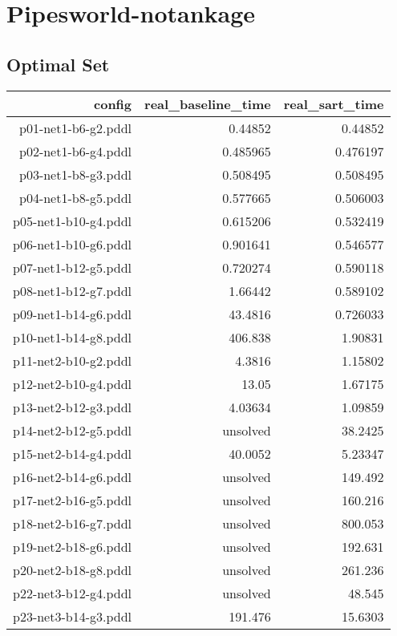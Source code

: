 \documentclass{article}
\begin{document}
                \newpage \section{Pipesworld-notankage}
                    \subsection*{Optimal Set}
                    
                            \begin{center}
                            \scriptsize
                            \begin{tabular}{r|r|r}
                            config & real\_baseline\_time & real\_sart\_time\\\midrule
                             p01-net1-b6-g2.pddl&0.44852&0.44852\\
 p02-net1-b6-g4.pddl&0.485965&0.476197\\
 p03-net1-b8-g3.pddl&0.508495&0.508495\\
 p04-net1-b8-g5.pddl&0.577665&0.506003\\
 p05-net1-b10-g4.pddl&0.615206&0.532419\\
 p06-net1-b10-g6.pddl&0.901641&0.546577\\
 p07-net1-b12-g5.pddl&0.720274&0.590118\\
 p08-net1-b12-g7.pddl&1.66442&0.589102\\
 p09-net1-b14-g6.pddl&43.4816&0.726033\\
 p10-net1-b14-g8.pddl&406.838&1.90831\\
 p11-net2-b10-g2.pddl&4.3816&1.15802\\
 p12-net2-b10-g4.pddl&13.05&1.67175\\
 p13-net2-b12-g3.pddl&4.03634&1.09859\\
 p14-net2-b12-g5.pddl&unsolved&38.2425\\
 p15-net2-b14-g4.pddl&40.0052&5.23347\\
 p16-net2-b14-g6.pddl&unsolved&149.492\\
 p17-net2-b16-g5.pddl&unsolved&160.216\\
 p18-net2-b16-g7.pddl&unsolved&800.053\\
 p19-net2-b18-g6.pddl&unsolved&192.631\\
 p20-net2-b18-g8.pddl&unsolved&261.236\\
 p22-net3-b12-g4.pddl&unsolved&48.545\\
 p23-net3-b14-g3.pddl&191.476&15.6303\\

\end{tabular}
\end{center}
\end{document}
